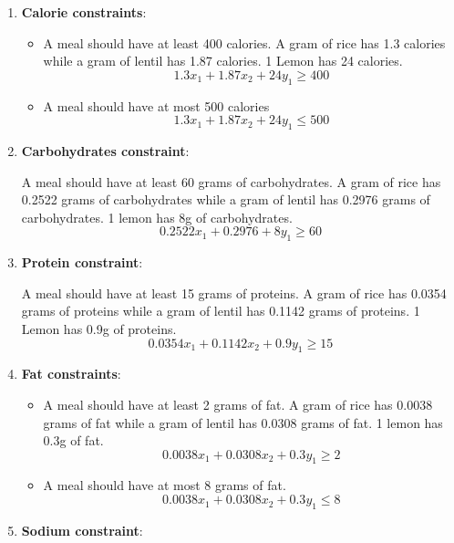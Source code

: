 \documentclass[
]{article}
\begin{document}
\begin{enumerate}
	\item \textbf{Calorie constraints}: 
	      \begin{itemize}
	      	\item A meal should have at least 400 calories.
	      	      A gram of rice has 1.3 calories while a gram of lentil has 1.87 calories. 1 Lemon has 24 calories.
	      	      \begin{equation}
	      	      	1.3x_1 + 1.87x_2 + 24y_1 \ge 400
	      	      \end{equation}
	      	\item A meal should have at most 500 calories
	      	      \begin{equation}
	      	      	1.3x_1 + 1.87x_2 + 24y_1 \le 500
	      	      \end{equation}
	      \end{itemize}
	\item \textbf{Carbohydrates constraint}:
	      	      
	      A meal should have at least 60 grams of carbohydrates. A gram of rice has 0.2522 grams of carbohydrates while a gram of lentil has 0.2976 grams of carbohydrates.
	      1 lemon has 8g of carbohydrates.
	      \begin{equation}
	      	0.2522x_1 + 0.2976 + 8y_1 \ge 60
	      \end{equation}
	\item \textbf{Protein constraint}:
	      	      
	      A meal should have at least 15 grams of proteins. A gram of rice has 0.0354 grams of proteins while a gram of lentil has 0.1142 grams of proteins.
	      1 Lemon has 0.9g of proteins.
	      \begin{equation}
	      	0.0354x_1 + 0.1142x_2 + 0.9y_1 \ge 15
	      \end{equation}
	\item \textbf{Fat constraints}: 
	      \begin{itemize}
	      	\item A meal should have at least 2 grams of fat.
	      	      A gram of rice has 0.0038 grams of fat while a gram of lentil has 0.0308 grams of fat.
	      	      1 lemon has 0.3g of fat.
	      	      \begin{equation}
	      	      	0.0038x_1 + 0.0308x_2 + 0.3y_1 \ge 2
	      	      \end{equation}
	      	\item A meal should have at most 8 grams of fat.
	      	      \begin{equation}
	      	      	0.0038x_1 + 0.0308x_2 + 0.3y_1 \le 8
	      	      \end{equation}
	      \end{itemize}
	\item \textbf{Sodium constraint}:
	      	      

\end{enumerate}
\end{document}
